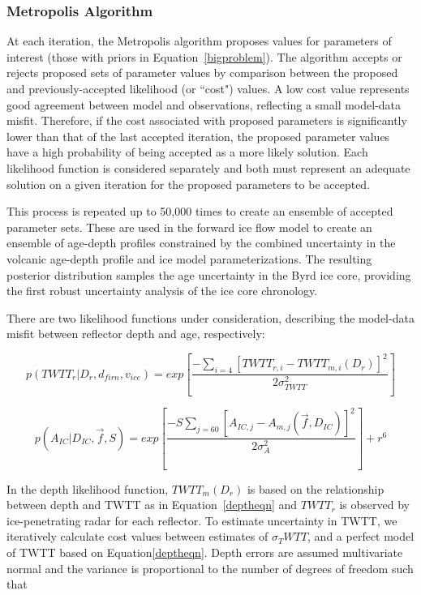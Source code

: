 \subsubsection{Metropolis Algorithm}\label{metrop}
At each iteration, the Metropolis algorithm proposes values for parameters of interest (those with priors in Equation~\ref{bigproblem}). The algorithm accepts or rejects proposed sets of parameter values by comparison between the proposed and previously-accepted likelihood (or ``cost") values. A low cost value represents good agreement between model and observations, reflecting a small model-data misfit. Therefore, if the cost associated with proposed parameters is significantly lower than that of the last accepted iteration, the proposed parameter values have a high probability of being accepted as a more likely solution. Each likelihood function is considered separately and both must represent an adequate solution on a given iteration for the proposed parameters to be accepted.

This process is repeated up to 50,000 times to create an ensemble of accepted parameter sets. These are used in the forward ice flow model to create an ensemble of age-depth profiles constrained by the combined uncertainty in the volcanic age-depth profile and ice model parameterizations. The resulting posterior distribution samples the age uncertainty in the Byrd ice core, providing the first robust uncertainty analysis of the ice core chronology. 

There are two likelihood functions under consideration, describing the model-data misfit between reflector depth and age, respectively:

\begin{equation}\label{eqn:loglikedepth}
p(TWTT_r | D_r,d_{firn},v_{ice} )= exp[\frac{-\sum_{i=4}[TWTT_{r,i} - TWTT_{m,i}(D_r)]^2}{2\sigma_{TWTT}^2}]
\end{equation}

\begin{equation}\label{loglikeage}
p(A_{IC} | D_{IC},\vec{f},S)= exp[\frac{-S\sum_{j = 60}[A_{IC,j} - A_{m,j}(\vec{f},D_{IC})]^2}{2\sigma_A^2}] + r^6
\end{equation}

In the depth likelihood function, $TWTT_m(D_r)$ is based on the relationship between depth and TWTT as in Equation~\ref{deptheqn} and $TWTT_r$ is observed by ice-penetrating radar for each reflector. To estimate uncertainty in TWTT, we iteratively calculate cost values between estimates of $\sigma_TWTT$, and a perfect model of TWTT based on Equation\ref{deptheqn}. Depth errors are assumed multivariate normal and the variance is proportional to the number of degrees of freedom such that

